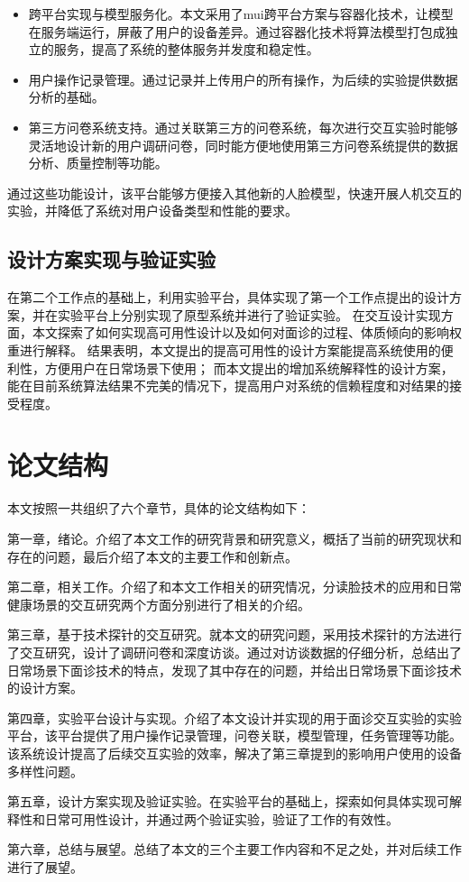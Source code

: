 \begin{itemize}

    \item 跨平台实现与模型服务化。本文采用了mui跨平台方案与容器化技术，让模型在服务端运行，屏蔽了用户的设备差异。通过容器化技术将算法模型打包成独立的服务，提高了系统的整体服务并发度和稳定性。

    \item 用户操作记录管理。通过记录并上传用户的所有操作，为后续的实验提供数据分析的基础。

    \item 第三方问卷系统支持。通过关联第三方的问卷系统，每次进行交互实验时能够灵活地设计新的用户调研问卷，同时能方便地使用第三方问卷系统提供的数据分析、质量控制等功能。

\end{itemize}

通过这些功能设计，该平台能够方便接入其他新的人脸模型，快速开展人机交互的实验，并降低了系统对用户设备类型和性能的要求。


\subsection{设计方案实现与验证实验}


在第二个工作点的基础上，利用实验平台，具体实现了第一个工作点提出的设计方案，并在实验平台上分别实现了原型系统并进行了验证实验。
在交互设计实现方面，本文探索了如何实现高可用性设计以及如何对面诊的过程、体质倾向的影响权重进行解释。
结果表明，本文提出的提高可用性的设计方案能提高系统使用的便利性，方便用户在日常场景下使用；
而本文提出的增加系统解释性的设计方案，能在目前系统算法结果不完美的情况下，提高用户对系统的信赖程度和对结果的接受程度。


\section{论文结构}
本文按照一共组织了六个章节，具体的论文结构如下：

第一章，绪论。介绍了本文工作的研究背景和研究意义，概括了当前的研究现状和存在的问题，最后介绍了本文的主要工作和创新点。

第二章，相关工作。介绍了和本文工作相关的研究情况，分读脸技术的应用和日常健康场景的交互研究两个方面分别进行了相关的介绍。

第三章，基于技术探针的交互研究。就本文的研究问题，采用技术探针的方法进行了交互研究，设计了调研问卷和深度访谈。通过对访谈数据的仔细分析，总结出了日常场景下面诊技术的特点，发现了其中存在的问题，并给出日常场景下面诊技术的设计方案。

第四章，实验平台设计与实现。介绍了本文设计并实现的用于面诊交互实验的实验平台，该平台提供了用户操作记录管理，问卷关联，模型管理，任务管理等功能。该系统设计提高了后续交互实验的效率，解决了第三章提到的影响用户使用的设备多样性问题。

第五章，设计方案实现及验证实验。在实验平台的基础上，探索如何具体实现可解释性和日常可用性设计，并通过两个验证实验，验证了工作的有效性。

第六章，总结与展望。总结了本文的三个主要工作内容和不足之处，并对后续工作进行了展望。